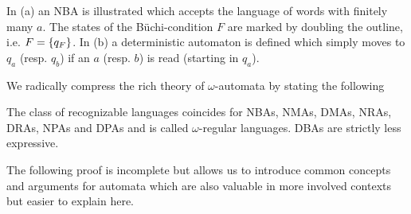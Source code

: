 \begin{drawing}
  \caption{In (a) an \ac{NBA} is illustrated which accepts the language of
  words with finitely many $a$. The states of the Büchi-condition $F$ are
  marked by doubling the outline, i.e. $F = \left\{q_{F}\right\}$.
  In (b) a deterministic automaton is defined which simply moves to $q_{a}$
  (resp. $q_{b}$) if an $a$ (resp. $b$) is read (starting in $q_{a}$).}
  \label{fig:finaautomata}
\end{drawing}
We radically compress the rich theory of $\omega$-automata by stating the
following
\begin{theorem}
  \cite[Theorem 1.19, Theorem 1.24, Section 1.3.2,Theorem 3.2]{AutoLogInfGames}
  The class of recognizable languages coincides for \acp{NBA}, \acp{NMA},
  \acp{DMA}, \acp{NRA}, \acp{DRA}, \acp{NPA} and \acp{DPA} and is called
  $\omega$-regular languages. \acp{DBA} are strictly less expressive.
  \label{thm:omegaregularexp}
\end{theorem}
The following proof is incomplete but allows us to introduce common concepts
and arguments for automata which are also valuable in more involved contexts
but easier to explain here.
